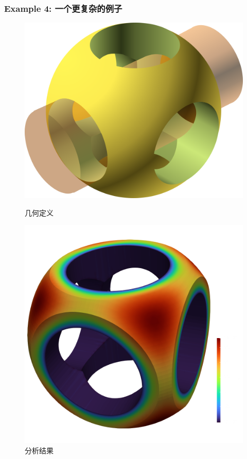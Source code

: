 \documentclass[lang=en,aspectratio=43,theme=default,logo=on]{simplebeamer}
\begin{document}
\begin{frame}[fragile]
    \frametitle{Example 4: 一个更复杂的例子}
    \begin{figure}
        \centering %
        \begin{minipage}[t]{0.5\linewidth}
            \centering
            \includegraphics[height=0.5\textheight]{./img/Openscad.png}
            \caption{几何定义}
        \end{minipage}%
        \begin{minipage}[t]{0.5\linewidth}
            \centering
            \includegraphics[height=0.5\textheight]{./img/013.png}
            \caption{分析结果}
        \end{minipage}
    \end{figure}
\end{frame}
\end{document}

